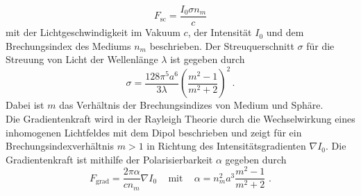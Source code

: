 \begin{equation}
  F_{\text{sc}} = \frac{I_0\sigma n_m}{c}
\end{equation}
mit der Lichtgeschwindigkeit im Vakuum $c$, der Intensität $I_0$ und dem Brechungsindex des Mediums $n_m$ beschrieben.
Der Streuquerschnitt $\sigma$ für die Streuung von Licht der Wellenlänge $\lambda$ ist gegeben durch
\begin{equation}
  \sigma = \frac{128 \pi^5 a^6}{3\lambda} \left(\frac{m^2-1}{m^2+2}\right)^2 \, .
\end{equation}
Dabei ist $m$ das Verhältnis der Brechungsindizes von Medium und Sphäre.\\
Die Gradientenkraft wird in der Rayleigh Theorie durch die Wechselwirkung eines inhomogenen Lichtfeldes mit dem Dipol beschrieben und zeigt für ein Brechungsindexverhältnis $m>1$ in Richtung des Intensitätsgradienten $\nabla I_0$. \cite{anleitung} Die Gradientenkraft ist mithilfe der Polarisierbarkeit $\alpha$ gegeben durch
\begin{equation}
  F_{\text{grad}} = \frac{2\pi\alpha}{cn_m}\nabla I_0 \,\,\,\,\,\,\, \text{mit} \,\,\,\,\,\,\, \alpha = n_m^2a^3\frac{m^2-1}{m^2+2}\,\,.
\end{equation}

